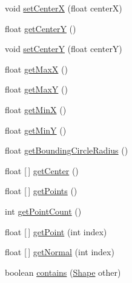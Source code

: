 \begin{DoxyCompactItemize}
\item 
void \mbox{\hyperlink{classorg_1_1newdawn_1_1slick_1_1geom_1_1_shape_a226acf8b556b14ac2c3e2a7156f13c94}{set\+CenterX}} (float centerX)
\item 
float \mbox{\hyperlink{classorg_1_1newdawn_1_1slick_1_1geom_1_1_shape_a9937c71e414375a9974c7a5d8fcc06e5}{get\+CenterY}} ()
\item 
void \mbox{\hyperlink{classorg_1_1newdawn_1_1slick_1_1geom_1_1_shape_ad9ff9a26b4cb2799696bdc938965b2fc}{set\+CenterY}} (float centerY)
\item 
float \mbox{\hyperlink{classorg_1_1newdawn_1_1slick_1_1geom_1_1_shape_ac3770421955c18dbf97dbaac012e0727}{get\+MaxX}} ()
\item 
float \mbox{\hyperlink{classorg_1_1newdawn_1_1slick_1_1geom_1_1_shape_a860925719455f1c95a99983d268230b7}{get\+MaxY}} ()
\item 
float \mbox{\hyperlink{classorg_1_1newdawn_1_1slick_1_1geom_1_1_shape_a7084b3e9c59db526281ce336b92cceac}{get\+MinX}} ()
\item 
float \mbox{\hyperlink{classorg_1_1newdawn_1_1slick_1_1geom_1_1_shape_a09c14deb0a506790962cd8cd25e67091}{get\+MinY}} ()
\item 
float \mbox{\hyperlink{classorg_1_1newdawn_1_1slick_1_1geom_1_1_shape_afe63c86e48173e5a6b742ccf1ac86e19}{get\+Bounding\+Circle\+Radius}} ()
\item 
float \mbox{[}$\,$\mbox{]} \mbox{\hyperlink{classorg_1_1newdawn_1_1slick_1_1geom_1_1_shape_a1c413693dcdfc64cde4e604ccc930759}{get\+Center}} ()
\item 
float \mbox{[}$\,$\mbox{]} \mbox{\hyperlink{classorg_1_1newdawn_1_1slick_1_1geom_1_1_shape_aa2459b94ebcb915647bc487951fb15f9}{get\+Points}} ()
\item 
int \mbox{\hyperlink{classorg_1_1newdawn_1_1slick_1_1geom_1_1_shape_a2198e0c426b9694ee0bfdb82bce8ee99}{get\+Point\+Count}} ()
\item 
float \mbox{[}$\,$\mbox{]} \mbox{\hyperlink{classorg_1_1newdawn_1_1slick_1_1geom_1_1_shape_a2c426ef4050ca787892205c1ec1f67af}{get\+Point}} (int index)
\item 
float \mbox{[}$\,$\mbox{]} \mbox{\hyperlink{classorg_1_1newdawn_1_1slick_1_1geom_1_1_shape_a18b7f386a5e576dceefaa36d7858713f}{get\+Normal}} (int index)
\item 
boolean \mbox{\hyperlink{classorg_1_1newdawn_1_1slick_1_1geom_1_1_shape_ae9dcbe23fb1bcd01bac0ddcfe09685de}{contains}} (\mbox{\hyperlink{classorg_1_1newdawn_1_1slick_1_1geom_1_1_shape}{Shape}} other)
\item 

\end{DoxyCompactItemize}
